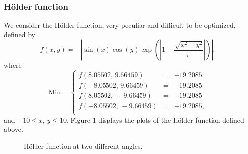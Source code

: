 \documentclass[10pt,letterpaper]{article}
\begin{document}
\subsubsection{H\"{o}lder function}

We consider the H\"{o}lder function, very peculiar and difficult to be optimized, defined by
$$f(x,y) = - \left| \sin(x) \cos(y) \exp \left( \left| 1 - \frac{\sqrt{x^2 + y^2}}{\pi}  \right|  \right)   \right|,$$
where
$$
\mathrm{Min} = \left\{
\begin{array}{ccc}
f(8.05502,\, 9.66459) & = & -19.2085 \\
f(-8.05502,\, 9.66459) & = & -19.2085 \\
f(8.05502,\, -9.66459) & = & -19.2085 \\
f(-8.05502,\,-9.66459) & = & -19.2085, \\
\end{array}
\right.
$$
and $-10 \leq x,\, y \leq 10$. Figure \ref{fig:holder} displays the plots of the H\"{o}lder function defined above.
\begin{figure}[H]
	\centering
	\caption{H\"{o}lder function at two different angles.}
	\label{fig:holder}
\end{figure}
\end{document}
